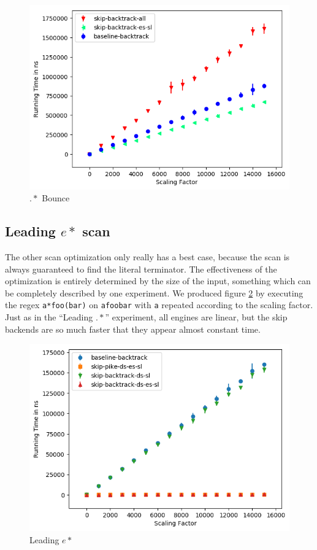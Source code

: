 \begin{figure}
\caption{$.*$ Bounce}
\label{fig:dotstar:bounce}

\includegraphics{resources/dotstar-bounce.png}
\end{figure}

\subsection{Leading $e*$ scan}

The other scan optimization only really has a best case, because
the scan is always guaranteed to find the literal terminator. The
effectiveness of the optimization is entirely determined by the
size of the input, something which can be completely described
by one experiment. We produced figure \ref{fig:leading:noncontaining:estar}
by executing the regex \verb'a*foo(bar)' on \verb'afoobar' with \verb'a'
repeated according to the scaling factor. Just as in the ``Leading $.*$''
experiment, all engines are linear, but the skip backends are so much
faster that they appear almost constant time.

\begin{figure}
\caption{Leading $e*$}
\label{fig:leading:noncontaining:estar}

\includegraphics{resources/leading-noncontaining-estar.png}
\end{figure}

